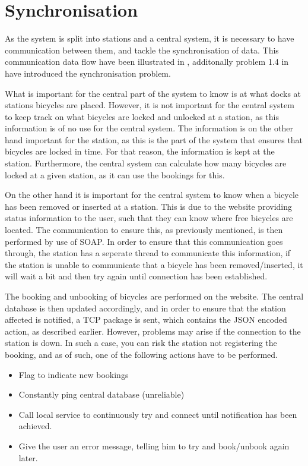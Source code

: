 \section{Synchronisation}
As the system is split into stations and a central system, it is necessary to have communication between them, and tackle the synchronisation of data.
This communication data flow have been illustrated in , additonally problem 1.4 in  have introduced the synchronisation problem.

\begin{description}[style=nextline]
	\item[Bicycle locking/unlocking not synchronised]
	What is important for the central part of the system to know is at what docks at stations bicycles are placed.
	However, it is not important for the central system to keep track on what bicycles are locked and unlocked at a station, as this information is of no use for the central system.
	The information is on the other hand important for the station, as this is the part of the system that ensures that bicycles are locked in time.
	For that reason, the information is kept at the station. Furthermore, the central system can calculate how many bicycles are locked at a given station, as it can use the bookings for this.
	
	\item[Removal/Insertion of bicycles]
	On the other hand it is important for the central system to know when a bicycle has been removed or inserted at a station.
	This is due to the website providing status information to the user, such that they can know where free bicycles are located.
	The communication to ensure this, as previously mentioned, is then performed by use of SOAP.
	In order to ensure that this communication goes through, the station has a seperate thread to communicate this information, if the station is unable to communicate that a bicycle has been removed/inserted, it will wait a bit and then try again until connection has been established.
	
	\item[Booking/Unbooking]
	The booking and unbooking of bicycles are performed on the website. 
	The central database is then updated accordingly, and in order to ensure that the station affected is notified, a TCP package is sent, which contains the JSON encoded action, as described earlier.
	However, problems may arise if the connection to the station is down.
	In such a case, you can risk the station not registering the booking, and as of such, one of the following actions have to be performed.
	\begin{itemize}
		\item Flag to indicate new bookings
		\item Constantly ping central database (unreliable)
		\item Call local service to continuously try and connect until notification has been achieved.
		\item Give the user an error message, telling him to try and book/unbook again later. 
	\end{itemize}
	

\end{description}

